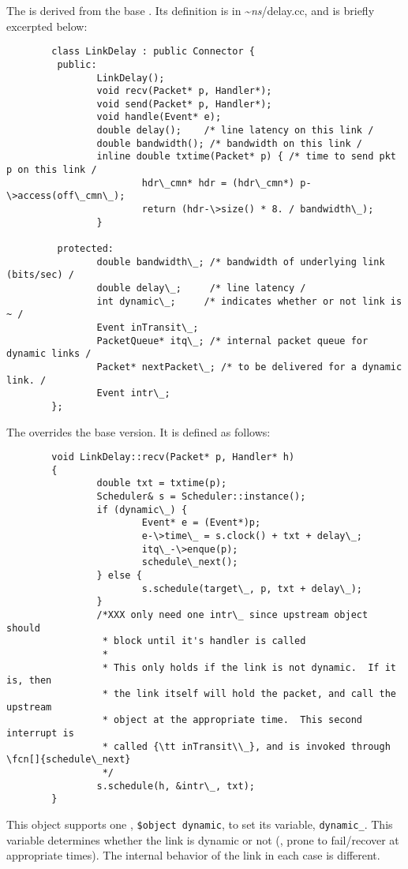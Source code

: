 The  is derived from the
base .
Its definition is in \textasciitilde\emph{ns}/{delay.cc}, and is briefly excerpted below:
\begin{verbatim}
        class LinkDelay : public Connector {
         public:
                LinkDelay();
                void recv(Packet* p, Handler*);
                void send(Packet* p, Handler*);
                void handle(Event* e);
                double delay();    /* line latency on this link /
                double bandwidth(); /* bandwidth on this link /
                inline double txtime(Packet* p) { /* time to send pkt p on this link /
                        hdr\_cmn* hdr = (hdr\_cmn*) p-\>access(off\_cmn\_);
                        return (hdr-\>size() * 8. / bandwidth\_);
                }

         protected:
                double bandwidth\_; /* bandwidth of underlying link (bits/sec) /
                double delay\_;     /* line latency /
                int dynamic\_;     /* indicates whether or not link is ~ /
                Event inTransit\_;
                PacketQueue* itq\_; /* internal packet queue for dynamic links /
                Packet* nextPacket\_; /* to be delivered for a dynamic link. /
                Event intr\_;
        };
\end{verbatim}
The 
overrides the base
 version.
It is defined as follows:
\begin{verbatim}
        void LinkDelay::recv(Packet* p, Handler* h)
        {    
                double txt = txtime(p);
                Scheduler& s = Scheduler::instance();
                if (dynamic\_) {
                        Event* e = (Event*)p;
                        e-\>time\_ = s.clock() + txt + delay\_; 
                        itq\_-\>enque(p);
                        schedule\_next();
                } else {
                        s.schedule(target\_, p, txt + delay\_);
                }       
                /*XXX only need one intr\_ since upstream object should
                 * block until it's handler is called
                 *       
                 * This only holds if the link is not dynamic.  If it is, then
                 * the link itself will hold the packet, and call the upstream
                 * object at the appropriate time.  This second interrupt is
                 * called {\tt inTransit\\_}, and is invoked through \fcn[]{schedule\_next}
                 */
                s.schedule(h, &intr\_, txt);
        }   
\end{verbatim}
This object supports one 
,
{\tt \$object dynamic},
to set its variable, {\tt dynamic\_}. 
This variable determines whether the link is dynamic or not (\ie, prone
to fail/recover at appropriate times).
The internal behavior of the link in each case is different.

